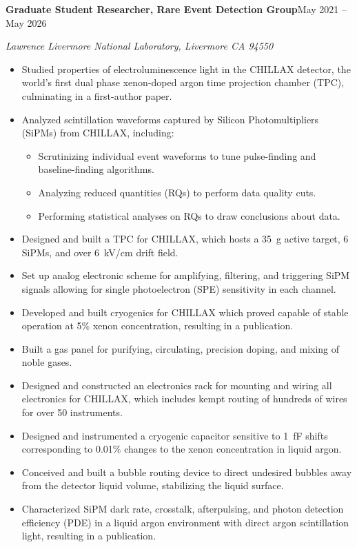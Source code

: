\documentclass[11pt,letterpaper]{article}
\newcommand{\entry}[2]{%
  \needspace{3\baselineskip}%
  \noindent\textbf{#1}\hfill #2\par}
\newcommand{\affil}[1]{\noindent\textit{#1}\par\vspace{1pt}}
\begin{document}
\entry{Graduate Student Researcher, Rare Event Detection Group}{May 2021 -- May 2026}
\affil{Lawrence Livermore National Laboratory, Livermore CA 94550}
\begin{itemize}
  \item Studied properties of electroluminescence light in the CHILLAX detector, the
        world's first dual phase xenon-doped argon time projection chamber (TPC),
        culminating in a first-author paper.
  \item Analyzed scintillation waveforms captured by Silicon Photomultipliers (SiPMs)
        from CHILLAX, including:
        \begin{itemize}
          \item Scrutinizing individual event waveforms to tune pulse-finding and
                baseline-finding algorithms.
          \item Analyzing reduced quantities (RQs) to perform data quality cuts.
          \item Performing statistical analyses on RQs to draw conclusions about data.
        \end{itemize}
  \item Designed and built a TPC for CHILLAX, which hosts a 35~g active target, 6 SiPMs,
        and over 6~kV/cm drift field.
  \item Set up analog electronic scheme for amplifying, filtering, and triggering SiPM
        signals allowing for single photoelectron (SPE) sensitivity in each channel.
  \item Developed and built cryogenics for CHILLAX which proved capable of stable
        operation at 5\% xenon concentration, resulting in a publication.
  \item Built a gas panel for purifying, circulating, precision doping, and mixing of
        noble gases.
  \item Designed and constructed an electronics rack for mounting and wiring all
        electronics for CHILLAX, which includes kempt routing of hundreds of wires for
        over 50 instruments.
  \item Designed and instrumented a cryogenic capacitor sensitive to 1~fF shifts
        corresponding to 0.01\% changes to the xenon concentration in liquid argon.
  \item Conceived and built a bubble routing device to direct undesired bubbles away
        from the detector liquid volume, stabilizing the liquid surface.
  \item Characterized SiPM dark rate, crosstalk, afterpulsing, and photon detection
        efficiency (PDE) in a liquid argon environment with direct argon scintillation
        light, resulting in a publication.
\end{itemize}
\end{document}
